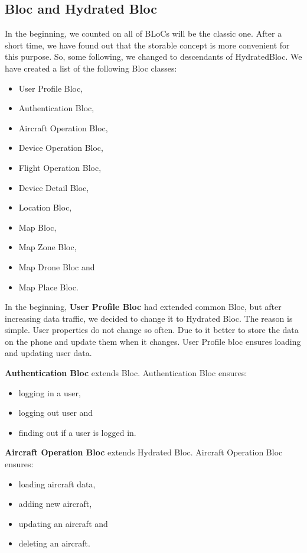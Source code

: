 \subsection{Bloc and Hydrated Bloc}\label{subsec:bloc-and-hydrated-bloc}
In the beginning, we counted on all of BLoCs will be the classic one.
After a short time, we have found out that the storable concept is more convenient for this purpose.
So, some following, we changed to descendants of HydratedBloc.
We have created a list of the following Bloc classes:
\begin{itemize}
    \item User Profile Bloc,
    \item Authentication Bloc,
    \item Aircraft Operation Bloc,
    \item Device Operation Bloc,
    \item Flight Operation Bloc,
    \item Device Detail Bloc,
    \item Location Bloc,
    \item Map Bloc,
    \item Map Zone Bloc,
    \item Map Drone Bloc and
    \item Map Place Bloc.
\end{itemize}

In the beginning, \textbf{User Profile Bloc} had extended common Bloc, but after increasing data traffic, we decided to change it to Hydrated Bloc.
The reason is simple.
User properties do not change so often.
Due to it better to store the data on the phone and update them when it changes.
User Profile bloc ensures loading and updating user data.

\textbf{Authentication Bloc} extends Bloc.
Authentication Bloc ensures:
\begin{itemize}
    \item logging in a user,
    \item logging out user and
    \item finding out if a user is logged in.
\end{itemize}

\textbf{Aircraft Operation Bloc} extends Hydrated Bloc.
Aircraft Operation Bloc ensures:
\begin{itemize}
    \item loading aircraft data,
    \item adding new aircraft,
    \item updating an aircraft and
    \item deleting an aircraft.
\end{itemize}

